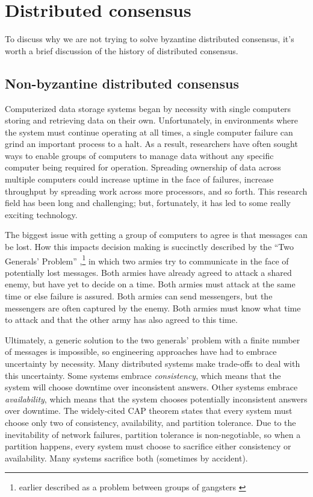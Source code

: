 \documentclass[8pt,fleqn,openany]{book}
\begin{document}
\newpage \appendix
{}

\chapter{Distributed consensus}\label{chap:dist-consensus}

To discuss why we are not trying to solve byzantine distributed consensus,
it's worth a brief discussion of the history of distributed consensus.

\section{Non-byzantine distributed consensus}

Computerized data storage systems began by necessity with single computers
storing and retrieving data on their own. Unfortunately, in environments where
the system must continue operating at all times, a single computer failure can
grind an important process to a halt. As a result, researchers have often
sought ways to enable groups of computers to manage data
without any specific computer being required for operation. Spreading ownership
of data across multiple computers could increase uptime in the face of failures,
increase throughput by spreading work across more processors, and so forth.
This research field has been long and challenging; but, fortunately, it has led
to some really exciting technology.

The biggest issue with getting a group of computers to agree is that messages
can be lost. How this impacts decision making is succinctly described by the
``Two Generals' Problem'' \cite{two-generals},\footnote{
earlier described as a problem
between groups of gangsters \cite{two-gangsters}} in which two armies try to
communicate in the face of potentially lost messages. Both armies have already
agreed to attack a shared enemy, but have yet to decide on a time. Both armies
must attack at the same time or else failure is assured. Both armies can send
messengers, but the messengers are often captured by the enemy. Both armies must
know what time to attack and that the other army has also agreed to this time.

Ultimately, a generic solution to the two generals' problem with a finite number
of messages is impossible, so engineering approaches have had
to embrace uncertainty by necessity. Many distributed systems make trade-offs to
deal with this uncertainty. Some systems embrace {\em consistency}, which means
that the system will choose downtime over inconsistent answers. Other
systems embrace {\em availability}, which means that the system chooses
potentially inconsistent answers over downtime. The widely-cited CAP
theorem \cite{cap1, cap2} states that every system must choose only two of
consistency, availability, and partition tolerance.
Due to the inevitability of network
failures, partition tolerance is non-negotiable, so when a partition happens,
every system must choose to sacrifice either consistency or availability. Many
systems sacrifice both (sometimes by accident).
\end{document}
